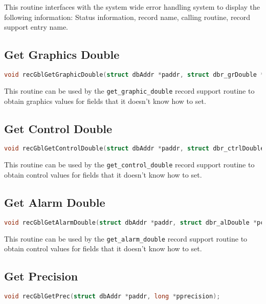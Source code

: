 This routine interfaces with the system wide error handling system to display the following information:
Status information, record name, calling routine, record support entry name.

\subsection{Get Graphics Double}

\begin{lstlisting}[language=C]
void recGblGetGraphicDouble(struct dbAddr *paddr, struct dbr_grDouble *pgd);
\end{lstlisting}

This routine can be used by the \verb|get_graphic_double| record support routine to obtain graphics values for fields that it doesn't know how to set.

\subsection{Get Control Double}

\begin{lstlisting}[language=C]
void recGblGetControlDouble(struct dbAddr *paddr, struct dbr_ctrlDouble *pcd);
\end{lstlisting}

This routine can be used by the \verb|get_control_double| record support routine to obtain control values for fields that it doesn't know how to set.

\subsection{Get Alarm Double}

\begin{lstlisting}[language=C]
void recGblGetAlarmDouble(struct dbAddr *paddr, struct dbr_alDouble *pcd);
\end{lstlisting}

This routine can be used by the \verb|get_alarm_double| record support routine to obtain control values for fields that it doesn't know how to set.

\subsection{Get Precision}

\begin{lstlisting}[language=C]
void recGblGetPrec(struct dbAddr *paddr, long *pprecision);
\end{lstlisting}

